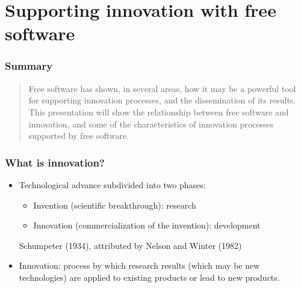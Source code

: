 
\section{Supporting innovation with free software}


\begin{frame}
\frametitle{Summary}

\begin{quote}
Free software has shown, in several areas, how it may be a powerful tool for supporting innovation processes, and the dissemination of its results. This presentation will show the relationship between free software and innovation, and some of the characteristics of innovation processes supported by free software.
\end{quote}

\end{frame}




\begin{frame}
\frametitle{What is innovation?}

\begin{itemize}
\item Technological advance subdivided into two phases:

  \begin{itemize}
  \item Invention (scientific breakthrough): research
  \item Innovation (commercialization of the invention): development
  \end{itemize}

  \begin{flushright}
    Schumpeter (1934), attributed by Nelson and Winter (1982)
  \end{flushright}

\item Innovation: process by which research results (which may be new technologies) are applied to existing products or lead to new products.
\end{itemize}

\end{frame}


